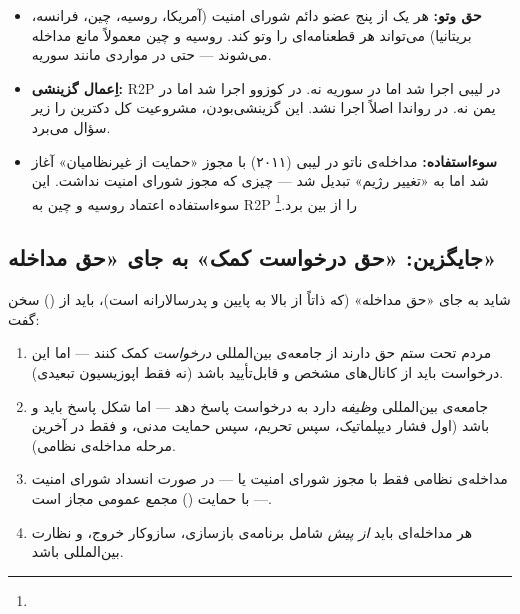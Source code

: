 \begin{tcolorbox}[enemybox, title={مشکلات عملی دکترین R2P}]
\begin{itemize}
\item \textbf{حق وتو:} هر یک از پنج عضو دائم شورای امنیت (آمریکا، روسیه، چین، فرانسه، بریتانیا) می‌تواند هر قطعنامه‌ای را وتو کند. روسیه و چین معمولاً مانع مداخله می‌شوند — حتی در مواردی مانند سوریه.
\item \textbf{اِعمال گزینشی:} R2P در لیبی اجرا شد اما در سوریه نه. در کوزوو اجرا شد اما در یمن نه. در رواندا اصلاً اجرا نشد. این گزینشی‌بودن، مشروعیت کل دکترین را زیر سؤال می‌برد.
\item \textbf{سوءاستفاده:} مداخله‌ی ناتو در لیبی (۲۰۱۱) با مجوز «حمایت از غیرنظامیان» آغاز شد اما به «تغییر رژیم» تبدیل شد — چیزی که مجوز شورای امنیت نداشت. این سوءاستفاده اعتماد روسیه و چین به R2P را از بین برد.\footnote{}
\end{itemize}
\end{tcolorbox}

\subsection{جایگزین: «حق درخواست کمک» به جای «حق مداخله»}
\label{subsec:ch15-right-to-request}

شاید به جای «حق مداخله» (که ذاتاً از بالا به پایین و پدرسالارانه است)، باید از  () سخن گفت:

\begin{tcolorbox}[defbox, title={چارچوب پیشنهادی: حق درخواست کمک}]
\begin{enumerate}
\item مردم تحت ستم حق دارند از جامعه‌ی بین‌المللی \textit{درخواست} کمک کنند — اما این درخواست باید از کانال‌های مشخص و قابل‌تأیید باشد (نه فقط اپوزیسیون تبعیدی).
\item جامعه‌ی بین‌المللی \textit{وظیفه} دارد به درخواست پاسخ دهد — اما شکل پاسخ باید  و  باشد (اول فشار دیپلماتیک، سپس تحریم، سپس حمایت مدنی، و فقط در آخرین مرحله مداخله‌ی نظامی).
\item مداخله‌ی نظامی فقط با مجوز شورای امنیت یا — در صورت انسداد شورای امنیت — با حمایت  () مجمع عمومی مجاز است.
\item هر مداخله‌ای باید \textit{از پیش} شامل برنامه‌ی بازسازی، سازوکار خروج، و نظارت بین‌المللی باشد.
\end{enumerate}
\end{tcolorbox}


